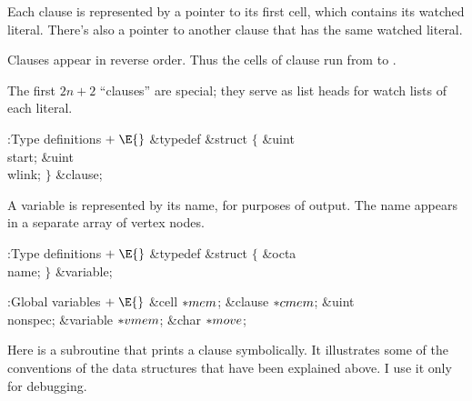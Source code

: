 Each clause is represented by a pointer to its first cell, which
contains its watched literal. There's also a pointer to another clause
that has the same watched literal.

Clauses appear in reverse order. Thus the cells of clause  run
from  to .

The first $2n+2$ ``clauses'' are special; they serve as list heads for
watch lists of each literal.

\Y\B\4:Type definitions\X${}\mathrel+\E{}$\6
\&{typedef} \&{struct} ${}\{{}$\1\6
\&{uint} \\{start};\6
\&{uint} \\{wlink};\2\6
${}\}{}$ \&{clause};\par
\fi

A variable is represented by its name, for purposes of output.
The name appears in a separate array  of vertex nodes.

\Y\B\4:Type definitions\X${}\mathrel+\E{}$\6
\&{typedef} \&{struct} ${}\{{}$\1\6
\&{octa} \\{name};\2\6
${}\}{}$ \&{variable};\par
\fi

\B{}:Global variables\X${}\mathrel+\E{}$\6
\&{cell} ${}{*}\\{mem}{}$;\6
\&{clause} ${}{*}\\{cmem}{}$;\6
\&{uint} \\{nonspec};\6
\&{variable} ${}{*}\\{vmem}{}$;\6
\&{char} ${}{*}\\{move}{}$;\par
\fi

Here is a subroutine that prints a clause symbolically. It illustrates
some of the conventions of the data structures that have been explained above.
I use it only for debugging.

